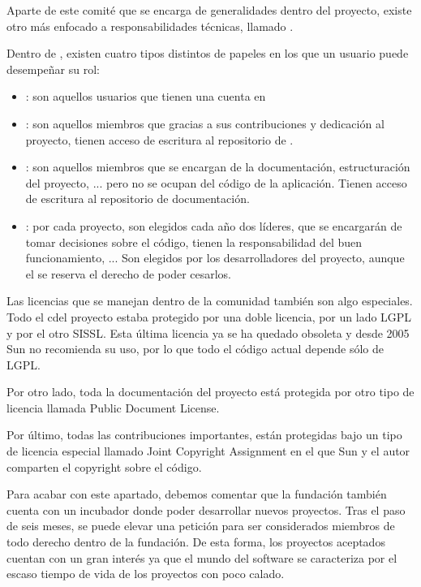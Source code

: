 Aparte de este comit\'e que se encarga de generalidades dentro del proyecto, existe otro m\'as enfocado a responsabilidades t\'ecnicas, llamado .

Dentro de , existen cuatro tipos distintos de papeles en los que un usuario puede desempeñar su rol:
\begin{itemize}
\item
{}: son aquellos usuarios que tienen una cuenta en 
\item
{}: son aquellos miembros que gracias a sus contribuciones y dedicaci\'on al proyecto, tienen acceso de escritura al repositorio de .
\item
{}: son aquellos miembros que se encargan de la documentaci\'on, estructuraci\'on del proyecto, ... pero no se ocupan del c\'odigo de la aplicaci\'on. Tienen acceso de escritura al repositorio de documentaci\'on.
\item
{}: por cada proyecto, son elegidos cada año dos l\'ideres, que se encargar\'an de tomar decisiones sobre el c\'odigo, tienen la responsabilidad del buen funcionamiento, ... Son elegidos por los desarrolladores del proyecto, aunque el  se reserva el derecho de poder cesarlos.
\end{itemize}

Las licencias que se manejan dentro de la comunidad  tambi\'en son algo especiales. Todo el c del proyecto estaba protegido por una doble licencia, por un lado LGPL y por el otro SISSL. Esta \'ultima licencia ya se ha quedado obsoleta y desde 2005 Sun no recomienda su uso, por lo que todo el c\'odigo actual depende s\'olo de LGPL.

Por otro lado, toda la documentaci\'on del proyecto est\'a protegida por otro tipo de licencia llamada Public Document License.

Por \'ultimo, todas las contribuciones importantes, est\'an protegidas bajo un tipo de licencia especial llamado Joint Copyright Assignment en el que Sun y el autor comparten el copyright sobre el c\'odigo.

Para acabar con este apartado, debemos comentar que la fundaci\'on  tambi\'en cuenta con un incubador donde poder desarrollar nuevos proyectos. Tras el paso de seis meses, se puede elevar una petici\'on para ser considerados miembros de todo derecho dentro de la fundaci\'on. De esta forma, los proyectos aceptados cuentan con un gran inter\'es ya que el mundo del software se caracteriza por el escaso tiempo de vida de los proyectos con poco calado.

